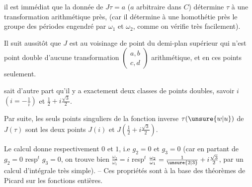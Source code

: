 il est immédiat que la donnée de $J\tau=a$ ($a$ arbitraire dans $C$) détermine $\tau$ à une transformation arithmétique près, (car il détermine à une homothétie près le groupe des périodes engendré par $\omega_1$ et $\omega_2$, comme on vérifie très facilement).

Il suit aussitôt que $J$ est  au voisinage de  point du demi-plan supérieur qui n'est point double d'aucune transformation $\left(\begin{smallmatrix}a,b\\c,d\end{smallmatrix}\right)$ arithmétique, et en ces points seulement.

 sait d'autre part qu'il y a exactement deux classes de points doubles, savoir $i$ $(i=-\frac1i)$ et $\frac12+i\frac{\sqrt3}{2}$.

Par suite, les seuls points singuliers  de la fonction inverse $\tau(\unsure{w|u})$ de $J(\tau)$ sont les deux points $J(i)$ et $J(\frac12+i\frac{\sqrt3}{2})$.

Le calcul donne respectivement $0$ et $1$, i.e $g_2=0$ et $g_3=0$ (car en partant de $g_2=0$ resp$^t$ $g_3=0$, on trouve bien $\frac{\omega_2}{\omega_1}=i$ resp$^t$ $\frac{\omega_2}{\omega_1}=\frac1{\unsure{2|3}}+i\frac{\sqrt3}{2}$, par un calcul d'intégrale très simple). -- Ces propriétés sont à la base des théorèmes de Picard sur les fonctions entières.

